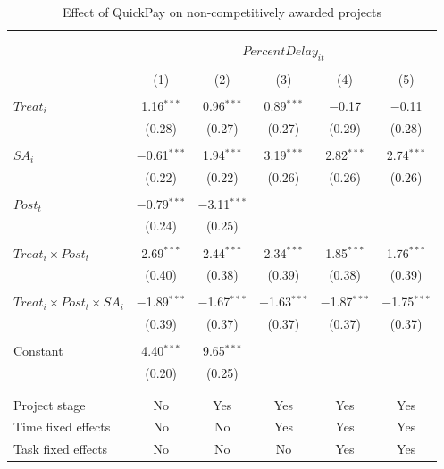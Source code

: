 \documentclass[
]{article}
\begin{document}
\begin{table}[H] \centering 
  \caption{Effect of QuickPay on non-competitively awarded projects} 
  \label{} 
\small 
\begin{tabular}{@{\extracolsep{-2pt}}lccccc} 
\\[-1.8ex]\hline 
\hline \\[-1.8ex] 
\\[-1.8ex] & \multicolumn{5}{c}{$PercentDelay_{it}$  } \\ 
\\[-1.8ex] & (1) & (2) & (3) & (4) & (5)\\ 
\hline \\[-1.8ex] 
 $Treat_i$ & 1.16$^{***}$ & 0.96$^{***}$ & 0.89$^{***}$ & $-$0.17 & $-$0.11 \\ 
  & (0.28) & (0.27) & (0.27) & (0.29) & (0.28) \\ 
  & & & & & \\ 
 $SA_i$ & $-$0.61$^{***}$ & 1.94$^{***}$ & 3.19$^{***}$ & 2.82$^{***}$ & 2.74$^{***}$ \\ 
  & (0.22) & (0.22) & (0.26) & (0.26) & (0.26) \\ 
  & & & & & \\ 
 $Post_t$ & $-$0.79$^{***}$ & $-$3.11$^{***}$ &  &  &  \\ 
  & (0.24) & (0.25) &  &  &  \\ 
  & & & & & \\ 
 $Treat_i \times Post_t$ & 2.69$^{***}$ & 2.44$^{***}$ & 2.34$^{***}$ & 1.85$^{***}$ & 1.76$^{***}$ \\ 
  & (0.40) & (0.38) & (0.39) & (0.38) & (0.39) \\ 
  & & & & & \\ 
 $Treat_i \times Post_t \times SA_i $ & $-$1.89$^{***}$ & $-$1.67$^{***}$ & $-$1.63$^{***}$ & $-$1.87$^{***}$ & $-$1.75$^{***}$ \\ 
  & (0.39) & (0.37) & (0.37) & (0.37) & (0.37) \\ 
  & & & & & \\ 
 Constant & 4.40$^{***}$ & 9.65$^{***}$ &  &  &  \\ 
  & (0.20) & (0.25) &  &  &  \\ 
  & & & & & \\ 
\hline \\[-1.8ex] 
Project stage & No & Yes & Yes & Yes & Yes \\ 
Time fixed effects & No & No & Yes & Yes & Yes \\ 
Task fixed effects & No & No & No & Yes & Yes \\ 

\end{tabular}
\end{table}
\end{document}
